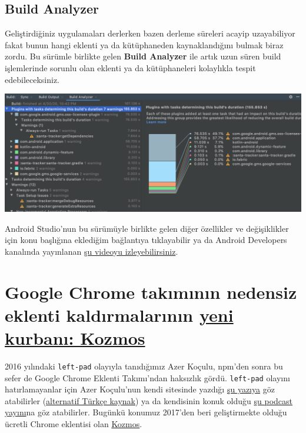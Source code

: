 \documentclass[11pt]{article}
\begin{document}
\subsection{Build Analyzer}
\label{sec:org883250e}
Geliştirdiğiniz uygulamaları derlerken bazen derleme süreleri acayip
uzayabiliyor fakat bunun hangi eklenti ya da kütüphaneden kaynaklandığını
bulmak biraz zordu. Bu sürümle birlikte gelen \textbf{Build Analyzer} ile artık uzun
süren build işlemlerinde sorunlu olan eklenti ya da kütüphaneleri kolaylıkla
tespit edebileceksiniz.

\begin{center}
\includegraphics[width=.9\linewidth]{gorseller/android-studio-4-0-build-analyzer.png}
\end{center}

Android Studio'nun bu sürümüyle birlikte gelen diğer özellikler ve
değişiklikler için konu başlığına eklediğim bağlantıya tıklayabilir ya da
Android Developers kanalında yayınlanan \href{https://www.youtube.com/watch?v=f1fHPqAYj5I}{şu videoyu izleyebilirsiniz}.
\section{Google Chrome takımının nedensiz eklenti kaldırmalarının \href{https://kodfabrik.com/journal/why-am-i-shutting-down-kozmos}{yeni kurbanı: Kozmos}}
\label{sec:org416ebd4}
2016 yılındaki \texttt{left-pad} olayıyla tanıdığımız Azer Koçulu, npm'den sonra bu
sefer de Google Chrome Eklenti Takımı'ndan haksızlık gördü. \texttt{left-pad} olayını
hatırlamayanlar için Azer Koçulu'nun kendi sitesinde yazdığı \href{https://kodfabrik.com/journal/i-ve-just-liberated-my-modules}{şu yazıya} göz
atabilirler (\href{https://medium.com/@eserozvataf/azer-ko\%25C3\%25A7ulu-kik-left-pad-ve-npm-ed7c3098ecfb}{alternatif Türkçe kaynak}) ya da kendisinin konuk olduğu \href{https://www.youtube.com/watch?v=KjHLfDBVLFE}{şu
podcast yayını}na göz atabilirler. Bugünkü konumuz 2017'den beri geliştirmekte
olduğu ücretli Chrome eklentisi olan \href{https://getkozmos.com/}{Kozmos}.
\end{document}
